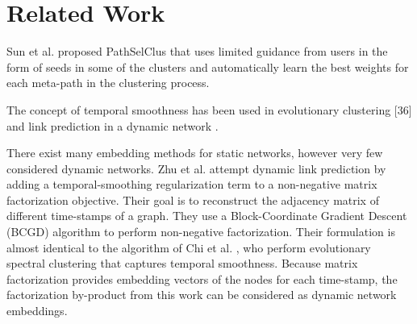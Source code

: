 \section{Related Work}

\cite{Zhu2016} \cite{sun2011pathsim} \cite{Sun:2012:HRP:2124295.2124373} \cite{huang2016meta}
\cite{wang2016relsim} \cite{sun2013pathselclus} \cite{sun2011ASONAM} \cite{Yang2012} \cite{liben2007link}

Sun et al. proposed PathSelClus \cite{sun2013pathselclus} that uses limited guidance from users in the form of seeds in some of the clusters and automatically learn the best weights for each meta-path in the clustering process.

The concept of temporal smoothness has been used in evolutionary clustering [36] and link prediction in a dynamic network \cite{Zhu2016}.

There exist many embedding methods for static networks, however very few considered dynamic networks. Zhu et al. \cite{Zhu2016} attempt dynamic link prediction by adding a temporal-smoothing regularization term to a non-negative matrix factorization objective. Their goal is to reconstruct the adjacency matrix of different time-stamps of a graph. They use a Block-Coordinate Gradient Descent (BCGD) algorithm to perform non-negative factorization. Their formulation is almost identical to the algorithm of Chi et al. \cite{Chi:2007}, who perform evolutionary spectral clustering that captures temporal smoothness. Because matrix factorization provides embedding vectors of the nodes for each time-stamp, the factorization by-product from this work can be considered as dynamic network embeddings.





